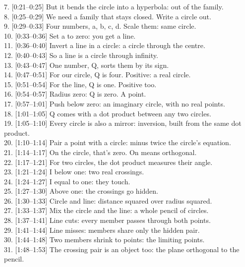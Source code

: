 \documentclass[10pt]{article}
\begin{document}
7. [0:21--0:25] But it bends the circle into a hyperbola: out of the family.\\
8. [0:25--0:29] We need a family that stays closed. Write a circle out.\\
9. [0:29--0:33] Four numbers, a, b, c, d. Scale them: same circle.\\
10. [0:33--0:36] Set a to zero: you get a line.\\
11. [0:36--0:40] Invert a line in a circle: a circle through the centre.\\
12. [0:40--0:43] So a line is a circle through infinity.\\
13. [0:43--0:47] One number, Q, sorts them by its sign.\\
14. [0:47--0:51] For our circle, Q is four. Positive: a real circle.\\
15. [0:51--0:54] For the line, Q is one. Positive too.\\
16. [0:54--0:57] Radius zero: Q is zero. A point.\\
17. [0:57--1:01] Push below zero: an imaginary circle, with no real points.\\
18. [1:01--1:05] Q comes with a dot product between any two circles.\\
19. [1:05--1:10] Every circle is also a mirror: inversion, built from the same dot product.\\
20. [1:10--1:14] Pair a point with a circle: minus twice the circle's equation.\\
21. [1:14--1:17] On the circle, that's zero. On means orthogonal.\\
22. [1:17--1:21] For two circles, the dot product measures their angle.\\
23. [1:21--1:24] I below one: two real crossings.\\
24. [1:24--1:27] I equal to one: they touch.\\
25. [1:27--1:30] Above one: the crossings go hidden.\\
26. [1:30--1:33] Circle and line: distance squared over radius squared.\\
27. [1:33--1:37] Mix the circle and the line: a whole pencil of circles.\\
28. [1:37--1:41] Line cuts: every member passes through both points.\\
29. [1:41--1:44] Line misses: members share only the hidden pair.\\
30. [1:44--1:48] Two members shrink to points: the limiting points.\\
31. [1:48--1:53] The crossing pair is an object too: the plane orthogonal to the pencil.\\
\end{document}
